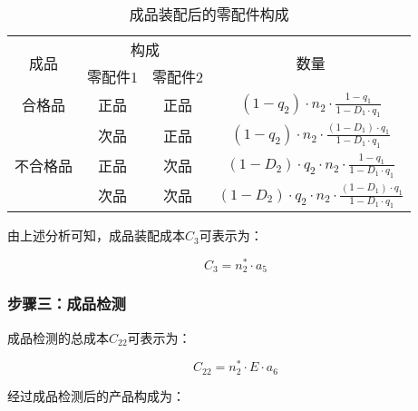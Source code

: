 \documentclass[withoutpreface,bwprint]{cumcmthesis} %
\begin{document}
\begin{table}[htbp]
			\centering
				\caption{成品装配后的零配件构成}
	\begin{tabular}{cccc}
		\toprule[1.5pt]
		\multirow{2}{*}{成品}   & \multicolumn{2}{c}{构成} & \multirow{2}{*}{数量} \\ \cline{2-3}
		& 零配件1       & 零配件2      &                     \\ \hline
		合格品                   & 正品         & 正品        & $(1-q _2) \cdot n _2 \cdot \frac{1-q _1}{1-D_ 1 \cdot q _1}$                   \\ \hline
		\multirow{3}{*}{不合格品} & 次品         & 正品        & $(1-q _2) \cdot n _2 \cdot \frac{(1-D _1) \cdot q _1}{1-D _1 \cdot q _1}$                   \\
		& 正品         & 次品        & $(1-D _2) \cdot q _2 \cdot n _2 \cdot \frac{1-q _1}{1-D_ 1 \cdot q _1}$                   \\
		& 次品         & 次品        & $(1-D_ 2) \cdot q_ 2 \cdot n _2 \cdot \frac{(1-D_ 1) \cdot q_ 1}{1-D_ 1 \cdot q _1}$                   \\ \bottomrule[1.5pt]
	\end{tabular}
\end{table}

由上述分析可知，成品装配成本$C_3$可表示为：

\begin{equation}
	C_3=n_2^*\cdot a_5 
\end{equation}

\subsubsection*{步骤三：成品检测}

成品检测的总成本$C_{22}$可表示为：

\begin{equation}
	C_{22} = n_2^* \cdot E \cdot a_6
\end{equation}

经过成品检测后的产品构成为：
\end{document}
